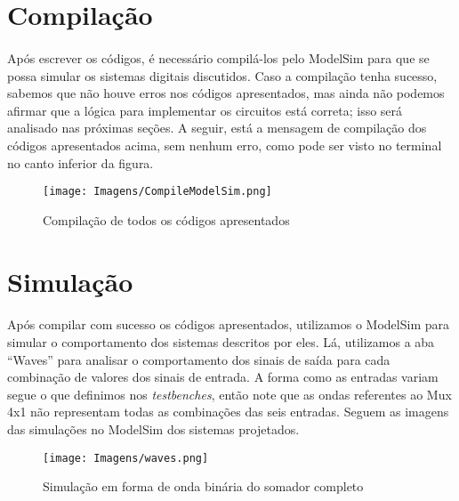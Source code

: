 \documentclass[a4paper,12pt]{article}
\begin{document}
\section{Compilação}
\paragraph{}
Após escrever os códigos, é necessário compilá-los pelo ModelSim para que se possa simular os sistemas digitais discutidos. Caso a compilação tenha sucesso, sabemos que não houve erros nos códigos apresentados, mas ainda não podemos afirmar que a lógica para implementar os circuitos está correta; isso será analisado nas próximas seções. A seguir, está a mensagem de compilação dos códigos apresentados acima, sem nenhum erro, como pode ser visto no terminal no canto inferior da figura.

\begin{figure}[H]
    \centering
    \texttt{[image: Imagens/CompileModelSim.png]}
    \caption{Compilação de todos os códigos apresentados}
\end{figure}

\section{Simulação}
\paragraph{}
Após compilar com sucesso os códigos apresentados, utilizamos o ModelSim para simular o comportamento dos sistemas descritos por eles. Lá, utilizamos a aba ``Waves'' para analisar o comportamento dos sinais de saída para cada combinação de valores dos sinais de entrada. A forma como as entradas variam segue o que definimos nos \textit{testbenches}, então note que as ondas referentes ao Mux 4x1 não representam todas as combinações das seis entradas. Seguem as imagens das simulações no ModelSim dos sistemas projetados.

\begin{figure}[H]
    \centering
    \begin{tcolorbox}[colframe=darkgray, colback=white, boxrule=0.5pt, arc=1pt, width=0.95\textwidth, center, boxsep=0pt, left=0pt, right=0pt]
    \texttt{[image: Imagens/waves.png]}
    \end{tcolorbox}
    \caption{Simulação em forma de onda binária do somador completo}
\end{figure}
\end{document}
